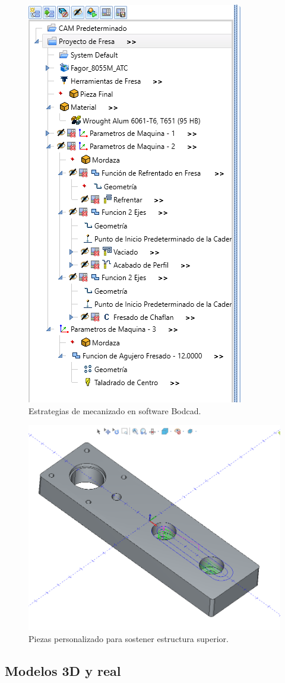 \begin{figure}[ht]
	\centering
	\includegraphics[width=.5\textwidth]{./Figures/3d_estrategia.png}
	\caption{Estrategias de mecanizado en software Bodcad.}
	\label{fig:estrategia}
\end{figure}

\begin{figure}[ht]
	\centering
	\includegraphics[width=.5\textwidth]{./Figures/3d_top.png}
	\caption{Piezas personalizado para sostener estructura superior.}
	\label{fig:estructura_superior}
\end{figure}

\subsection{Modelos 3D y real}


